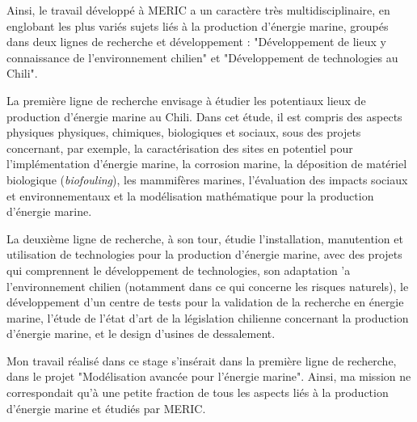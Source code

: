 \indent Ainsi, le travail développé à MERIC a un caractère très multidisciplinaire, en englobant les plus variés sujets liés à la production d'énergie marine, groupés dans deux lignes de recherche et développement : "Développement de lieux y connaissance de l'environnement chilien" et "Développement de technologies au Chili".

\indent La première ligne de recherche envisage à étudier les potentiaux lieux de production d'énergie marine au Chili. Dans cet étude, il est compris des aspects physiques physiques, chimiques, biologiques et sociaux, sous des projets concernant, par exemple, la caractérisation des sites en potentiel pour l'implémentation d'énergie marine, la corrosion marine, la déposition de matériel biologique (\emph{biofouling}), les mammifères marines, l'évaluation des impacts sociaux et environnementaux et la modélisation mathématique pour la production d'énergie marine.

\indent La deuxième ligne de recherche, à son tour, étudie l'installation, manutention et utilisation de technologies pour la production d'énergie marine, avec des projets qui comprennent le développement de technologies, son adaptation 'a l'environnement chilien (notamment dans ce qui concerne les risques naturels), le développement d'un centre de tests pour la validation de la recherche en énergie marine, l'étude de l'état d'art de la législation chilienne concernant la production d'énergie marine, et le design d'usines de dessalement.

\indent Mon travail réalisé dans ce stage s'insérait dans la première ligne de recherche, dans le projet "Modélisation avancée pour l'énergie marine". Ainsi, ma mission ne correspondait qu'à une petite fraction de tous les aspects liés à la production d'énergie marine et étudiés par MERIC.

